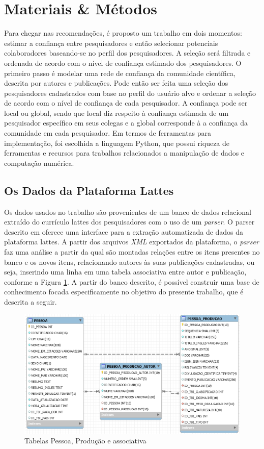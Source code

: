 \documentclass[12pt]{article}
\begin{document}
\section{Materiais \& Métodos}

Para chegar nas recomendações, é proposto um trabalho em dois momentos: estimar a confiança entre pesquisadores e então
selecionar potenciais colaboradores baseando-se no perfil dos pesquisadores. A seleção será filtrada e ordenada de acordo com o 
nível de confiança estimado dos pesquisadores. O primeiro passo é modelar uma rede de confiança da comunidade científica, descrita 
por autores e publicações. Pode então ser feita uma seleção dos pesquisadores cadastrados com base no perfil do usuário alvo e 
ordenar a seleção de acordo com o nível de confiança de cada pesquisador. A confiança pode ser local ou global, sendo que local diz 
respeito à confiança estimada de um pesquisador específico em seus colegas e a global corresponde à a confiança da comunidade em 
cada pesquisador. Em termos de ferramentas para implementação, foi escolhida a linguagem Python, que possui riqueza de ferramentas 
e recursos para trabalhos relacionados a manipulação de dados e computação numérica.%

\subsection{Os Dados da Plataforma Lattes}

Os dados usados no trabalho são provenientes de um banco de dados relacional extraído do currículo lattes dos pesquisadores com o 
uso de um \textit{parser}. O parser descrito em \cite{prass2019parser} oferece uma interface para a extração automatizada de dados 
da plataforma lattes. A partir dos arquivos \textit{XML} exportados da plataforma, o \textit{parser} faz uma análise a partir da 
qual são montadas relações entre os itens presentes no banco e os novos itens, relacionando autores às suas publicações cadastradas, 
ou seja, inserindo uma linha em uma tabela associativa entre autor e publicação, conforme a Figura \ref{fig:database}. A partir do banco descrito, é 
possível construir uma base de conhecimento focada especificamente no objetivo do presente trabalho, que é descrita a seguir.

\begin{center}
  \begin{figure}[ht]
    \centering
    \includegraphics[width=.8\textwidth]{database.png}
    \caption{Tabelas Pessoa, Produção e associativa \cite{prass2019parser}}
    \label{fig:database}
  \end{figure}
 \end{center}
\end{document}
